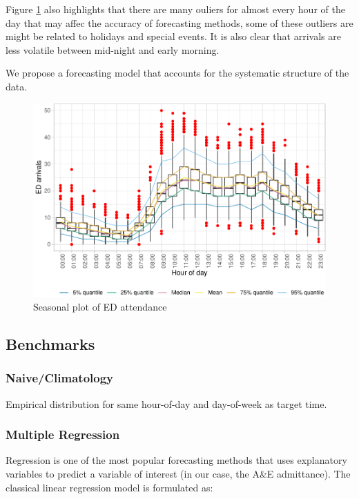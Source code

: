 \documentclass[]{elsarticle} %
\begin{document}
Figure \ref{fig:hourly-plot} also highlights that there are many ouliers for almost every hour of the day that may affec the accuracy of forecasting methods, some of these outliers are might be related to holidays and special events. It is also clear that arrivals are less volatile between mid-night and early morning.

We propose a forecasting model that accounts for the systematic structure of the data.

\begin{figure}[H]

{\centering \includegraphics[width=0.7\linewidth]{paper_files/figure-latex/hourly-plot-1} 

}

\caption{Seasonal plot of ED attendance}\label{fig:hourly-plot}
\end{figure}

\hypertarget{benchmarks}{%
\subsection{Benchmarks}\label{benchmarks}}

\hypertarget{naiveclimatology}{%
\subsubsection{Naive/Climatology}\label{naiveclimatology}}

Empirical distribution for same hour-of-day and day-of-week as target time.

\hypertarget{multiple-regression}{%
\subsubsection{Multiple Regression}\label{multiple-regression}}

Regression is one of the most popular forecasting methods that uses explanatory variables to predict a variable of interest (in our case, the A\&E admittance). The classical linear regression model is formulated as:
\end{document}
